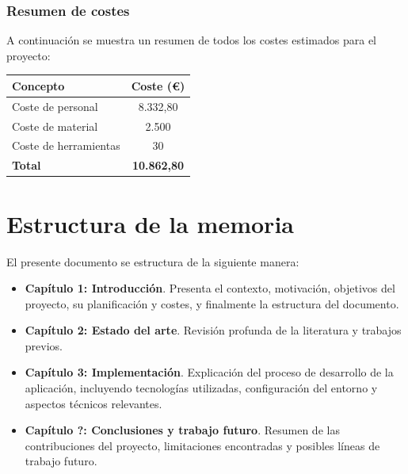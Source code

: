 \subsubsection{Resumen de costes}

A continuación se muestra un resumen de todos los costes estimados para el proyecto:

\begin{center}
\begin{tabular}{|l|c|}
\hline
\textbf{Concepto} & \textbf{Coste (€)} \\
\hline
Coste de personal & 8.332,80 \\
Coste de material & 2.500 \\
Coste de herramientas & 30 \\
\hline
\textbf{Total} & \textbf{10.862,80} \\
\hline
\end{tabular}
\end{center}
\section{Estructura de la memoria}

El presente documento se estructura de la siguiente manera:

\begin{itemize}
    \item \textbf{Capítulo 1: Introducción}. Presenta el contexto, motivación, objetivos del proyecto, su planificación y costes, y finalmente la estructura del documento.
    
    \item \textbf{Capítulo 2: Estado del arte}. Revisión profunda de la literatura y trabajos previos.

    
    
    \item \textbf{Capítulo 3: Implementación}. Explicación del proceso de desarrollo de la aplicación, incluyendo tecnologías utilizadas, configuración del entorno y aspectos técnicos relevantes.
    
    
    \item \textbf{Capítulo ?: Conclusiones y trabajo futuro}. Resumen de las contribuciones del proyecto, limitaciones encontradas y posibles líneas de trabajo futuro.
\end{itemize}
